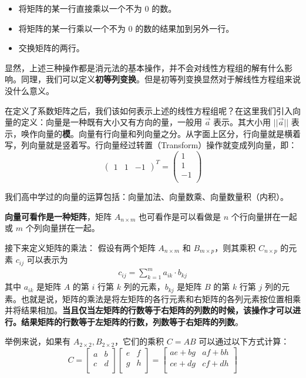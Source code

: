 \documentclass[b5paper]{ctexart}
\begin{document}
	\begin{itemize}
		\item 将矩阵的某一行直接乘以一个不为 $0$ 的数。
		
		\item 将矩阵的某一行乘以一个不为 $0$ 的数的结果加到另外一行。
		
		\item 交换矩阵的两行。
	\end{itemize}
	显然，上述三种操作都是消元法的基本操作，并不会对线性方程组的解有什么影响。同理，我们可以定义\textbf{初等列变换}。但是初等列变换显然对于解线性方程组来说没什么意义。
	
	在定义了系数矩阵之后，我们该如何表示上述的线性方程组呢？在这里我们引入向量的定义：向量是一种既有大小又有方向的量，一般用 $\vec{a}$ 表示。其大小用 $||\vec{a}||$ 表示，唤作向量的\textbf{模}。向量有行向量和列向量之分。从字面上区分，行向量就是横着写，列向量就是竖着写。行向量经过转置（Transform）操作就变成列向量，即：
	\[
	\begin{pmatrix}
		1 & 1 & -1
	\end{pmatrix}^T = 
	\begin{pmatrix}
		1 \\ 1 \\ -1\\
	\end{pmatrix}
	\]
	
	我们高中学过的向量的运算包括：向量加法、向量数乘、向量数量积（内积）。
	
	\textbf{向量可看作是一种矩阵}，矩阵 $A_{n \times m}$ 也可看作是可以看做是 $n$ 个行向量拼在一起或 $m$ 个列向量拼在一起。
	
	接下来定义矩阵的乘法：
	假设有两个矩阵 $A_{n \times m}$ 和 $B_{m \times p}$，则其乘积 $C_{n \times p}$ 的元素 $c_{ij}$ 可以表示为
	\begin{align*}
		c_{ij} = \sum_{k=1}^{m} a_{ik} \cdot b_{kj}
	\end{align*}
	其中 $a_{ik}$ 是矩阵 $A$ 的第 $i$ 行第 $k$ 列的元素，$b_{kj}$ 是矩阵 $B$ 的第 $k$ 行第 $j$ 列的元素。也就是说，矩阵的乘法是将左矩阵的各行元素和右矩阵的各列元素按位置相乘并将结果相加。\textbf{当且仅当左矩阵的行数等于右矩阵的列数的时候，该操作才可以进行。结果矩阵的行数等于左矩阵的行数，列数等于右矩阵的列数}。
	
	举例来说，如果有 $A_{2 \times 2}, B_{2 \times 2}$，它们的乘积 $C = AB$ 可以通过以下方式计算：
	\[
	C = 
	\begin{bmatrix}
		a & b \\
		c & d \\
	\end{bmatrix}
	\begin{bmatrix}
		e & f \\
		g & h \\
	\end{bmatrix}
	=
	\begin{bmatrix}
		ae + bg & af + bh \\
		ce + dg & cf + dh \\
	\end{bmatrix}
	\]
	
\end{document}
